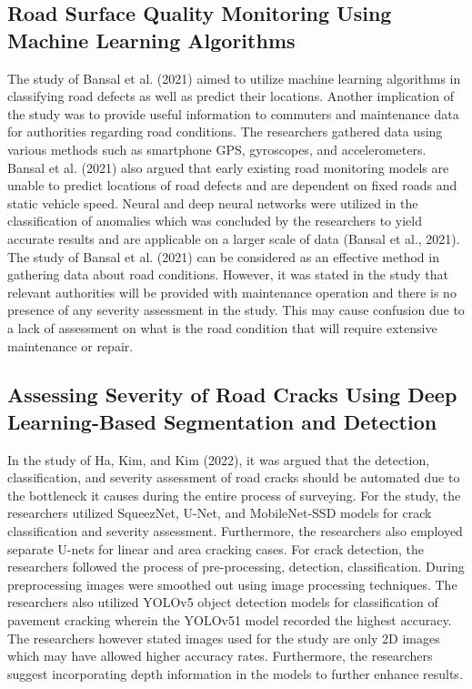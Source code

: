 \documentclass{report} %
\begin{document}
	
	\subsection{Road Surface Quality Monitoring Using Machine Learning Algorithms}
		The study of Bansal et al. (2021) aimed to utilize machine learning algorithms in classifying road defects as well as predict their locations. Another implication of the study was to provide useful information to commuters and maintenance data for authorities regarding road conditions. The researchers gathered data using various methods such as smartphone GPS, gyroscopes, and accelerometers. Bansal et al. (2021) also argued that early existing road monitoring models are unable to predict locations of road defects and are dependent on fixed roads and static vehicle speed.  Neural and deep neural networks were utilized in the classification of anomalies which was concluded by the researchers to yield accurate results and are applicable on a larger scale of data (Bansal et al., 2021). The study of Bansal et al. (2021) can be considered as an effective method in gathering data about road conditions. However, it was stated in the study that relevant authorities will be provided with maintenance operation and there is no presence of any severity assessment in the study. This may cause confusion due to a lack of assessment on what is the road condition that will require extensive maintenance or repair.

	
	\subsection{Assessing Severity of Road Cracks Using Deep Learning-Based Segmentation and Detection}
		In the study of Ha, Kim, and Kim (2022), it was argued that the detection, classification, and severity assessment of road cracks should be automated due to the bottleneck it causes during the entire process of surveying. For the study, the researchers utilized SqueezNet, U-Net, and MobileNet-SSD models for crack classification and severity assessment. Furthermore, the researchers also employed separate U-nets for linear and area cracking cases. For crack detection, the researchers followed the process of pre-processing, detection, classification. During preprocessing images were smoothed out using image processing techniques. The researchers also utilized YOLOv5 object detection models for classification of pavement cracking wherein the YOLOv51 model recorded the highest accuracy. The researchers however stated images used for the study are only 2D images which may have allowed higher accuracy rates. Furthermore, the researchers suggest incorporating depth information in the models to further enhance results.
	
\end{document}
